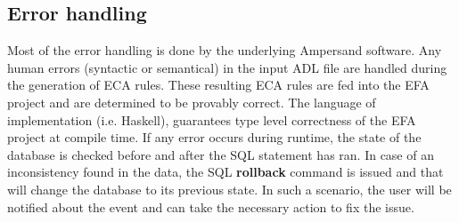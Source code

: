 \documentclass[12pt, svgnames]{article}
\let\Oldsubsection\subsection
\renewcommand{\subsection}{\FloatBarrier\Oldsubsection}
\begin{document}
\subsection{Error handling}
Most of the error handling is done by the underlying Ampersand software. Any 
human errors (syntactic or semantical) in the input ADL file are handled during 
the generation of ECA rules. These resulting ECA rules are fed into the EFA 
project and are determined to be provably correct.  The 
language of implementation (i.e. Haskell), 
guarantees type level correctness of the EFA project at compile time. 
\newline
If any error occurs during runtime, the state of the database is checked 
before and after the SQL statement has ran. In case of an inconsistency found 
in the data, the SQL \textbf{rollback} command is issued and that will change 
the database to its previous state. In such a scenario, the user will be 
notified about the event and can take the necessary action to fix the issue. 


\end{document}
